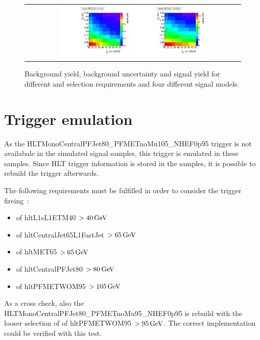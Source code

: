 \begin{figure}[!h]
\begin{tabular}{c}
    \includegraphics[width=0.35\textwidth]{figures/analysis/Optimisation/Madgraph_signal_mass_500_ctau_5cm_ECaloLe5_SignalYield.pdf}
    \includegraphics[width=0.35\textwidth]{figures/analysis/Optimisation/Madgraph_signal_mass_500_ctau_50cm_ECaloLe5_SignalYield.pdf}\\ 
  \end{tabular}
  \caption{Background yield, background uncertainty and signal yield for different \pt and \ias selection requirements and four different signal models.}
  \label{fig:optimisationApp}
\end{figure} 


\clearpage
\chapter{Trigger emulation}
\label{app:TriggerEmulation}

As the HLTMonoCentralPFJet80\_PFMETnoMu105\_NHEF0p95 trigger is not availabale in the simulated signal samples, this trigger is emulated in these samples.
Since HLT trigger information is stored in the samples, it is possible to rebuild the trigger afterwards. 

The following requirements must be fulfilled in order to consider the trigger fireing~\cite{bib:CMS:DT_Thesis,bib:CMS:DT_8TeV_AN}:
\begin{itemize}
\item \pt of hltL1sL1ETM40 $>40\,\text{Ge}\kern-0.06667em\text{V}$
\item \pt of hltCentralJet65L1FastJet $>65\,\text{Ge}\kern-0.06667em\text{V}$
\item \pt of hltMET65 $>65\,\text{Ge}\kern-0.06667em\text{V}$
\item \pt of hltCentralPFJet80 $>80\,\text{Ge}\kern-0.06667em\text{V}$
\item \pt of hltPFMETWOM95 $>105\,\text{Ge}\kern-0.06667em\text{V}$
\end{itemize}
As a cross check, also the HLTMonoCentralPFJet80\_PFMETnoMu95\_NHEF0p95 is rebuild with the looser selection of \pt of hltPFMETWOM95 $>95\,\text{Ge}\kern-0.06667em\text{V}$.
The correct implementation could be verified with this test.

